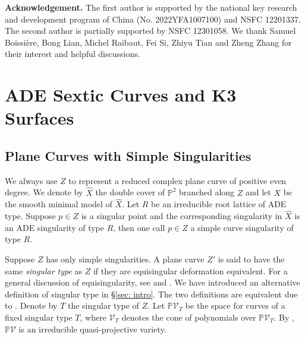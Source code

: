 \documentclass[12pt,reqno,a4paper]{amsart}
\theoremstyle{remark}
\theoremstyle{definition}
\newcommand{\PP}{\mathbb{P}}
\newcommand{\calV}{\mathcal{V}}
\newcommand{\calZ}{\mathcal{Z}}
\begin{document}
\textbf{Acknowledgement.}
The first author is supported by the national key research and development program of China (No. 2022YFA1007100) and NSFC 12201337. The second author is partially supported by NSFC 12301058. We thank Samuel Boissi\`{e}re, Bong Lian, Michel Raibaut, Fei Si, Zhiyu Tian and Zheng Zhang for their interest and helpful discussions. 


\section{ADE Sextic Curves and K3 Surfaces}
\label{section: K3}

\subsection{Plane Curves with Simple Singularities}
\label{subsection: ADE sextic}
We always use $Z$ to represent a reduced complex plane curve of positive even degree. We denote by $\widehat{X}$ the double cover of $\PP^2$ branched along $Z$ and let $X$ be the smooth minimal model of $\widehat{X}$. Let $R$ be an irreducible root lattice of ADE type. Suppose $p\in Z$ is a singular point and the corresponding singularity in $\widehat{X}$ is an ADE singularity of type $R$, then one call $p\in Z$ a simple curve singularity of type $R$. 

Suppose $Z$ has only simple singularities.
A plane curve $Z'$ is said to have the same \emph{singular type} as $Z$ if they are equisingular deformation equivalent.
For a general discussion of equisingularity, see \cite{zariski1965equisingularityI,zariski1965equisingularityII,zariski1968equisingularityIII} and \cite{greuel2007singularities}.
We have introduced an alternative definition of singular type in \S \ref{sec: intro}.
The two definitions are equivalent due to \cite[Proposition 2.1]{greuel1996equianalytic}.
Denote by $T$ the singular type of $Z$.
Let $\PP\calV_T$ be the space for curves of a fixed singular type $T$, where $\calV_T$ denotes the cone of polynomials over $\PP\calV_T$. By \cite[Prop 2.1]{greuel1996equianalytic}, $\PP\calV$ is an irreducible quasi-projective variety.
\end{document}
